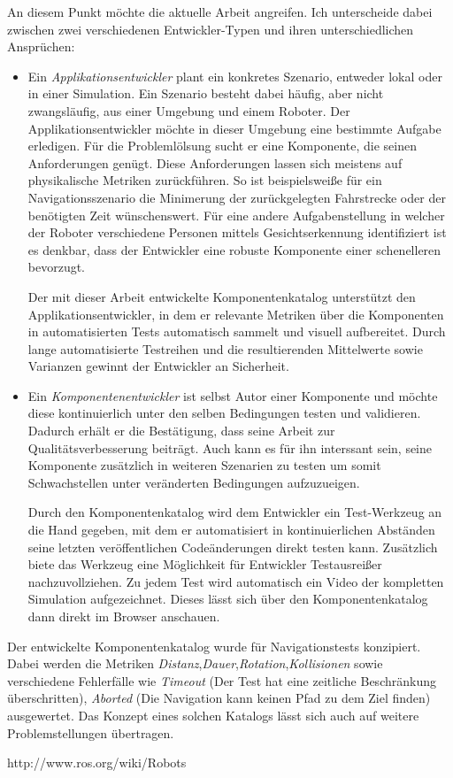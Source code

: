\documentclass{scrreprt}
\begin{document}
An diesem Punkt möchte die aktuelle Arbeit angreifen. Ich unterscheide dabei zwischen zwei verschiedenen Entwickler-Typen und ihren unterschiedlichen Ansprüchen: \begin{itemize}
\item Ein \emph{Applikationsentwickler} plant ein konkretes Szenario, entweder lokal oder in einer Simulation. Ein Szenario besteht dabei häufig, aber nicht zwangsläufig, aus einer Umgebung und einem Roboter. Der Applikationsentwickler möchte in dieser Umgebung eine bestimmte Aufgabe erledigen. Für die Problemlölsung sucht er eine Komponente, die seinen Anforderungen genügt. Diese Anforderungen lassen sich meistens auf physikalische Metriken zurückführen. So ist beispielsweiße für ein Navigationsszenario die Minimerung der zurückgelegten Fahrstrecke oder der benötigten Zeit wünschenswert. Für eine andere Aufgabenstellung in welcher der Roboter verschiedene Personen mittels Gesichtserkennung identifiziert ist es denkbar, dass der Entwickler eine robuste Komponente einer schenelleren bevorzugt.

    Der mit dieser Arbeit entwickelte Komponentenkatalog unterstützt den Applikationsentwickler, in dem er relevante Metriken über die Komponenten in automatisierten Tests automatisch sammelt und visuell aufbereitet. Durch lange automatisierte Testreihen und die resultierenden Mittelwerte sowie Varianzen gewinnt der Entwickler an Sicherheit.

\item Ein \emph{Komponentenentwickler} ist selbst Autor einer Komponente und möchte diese kontinuierlich unter den selben Bedingungen testen und validieren. Dadurch erhält er die Bestätigung, dass seine Arbeit zur Qualitätsverbesserung beiträgt. Auch kann es für ihn interssant sein, seine Komponente zusätzlich in weiteren Szenarien zu testen um somit Schwachstellen unter veränderten Bedingungen aufzuzueigen.

    Durch den Komponentenkatalog wird dem Entwickler ein Test-Werkzeug an die Hand gegeben, mit dem er automatisiert in kontinuierlichen Abständen seine letzten veröffentlichen Codeänderungen direkt testen kann. 
    Zusätzlich biete das Werkzeug eine Möglichkeit für Entwickler Testausreißer nachzuvollziehen. Zu jedem Test wird automatisch ein Video der kompletten Simulation aufgezeichnet. Dieses lässt sich über den Komponentenkatalog dann direkt im Browser anschauen.
\end{itemize}

Der entwickelte Komponentenkatalog wurde für Navigationstests konzipiert. Dabei werden die Metriken \emph{Distanz},\emph{Dauer},\emph{Rotation},\emph{Kollisionen} sowie verschiedene Fehlerfälle wie \emph{Timeout} (Der Test hat eine zeitliche Beschränkung überschritten), \emph{Aborted} (Die Navigation kann keinen Pfad zu dem Ziel finden) ausgewertet. Das Konzept eines solchen Katalogs lässt sich auch auf weitere Problemstellungen übertragen. 

\newpage
\begin{thebibliography}{999}
http://www.ros.org/wiki/Robots
\end{thebibliography}
\end{document}
